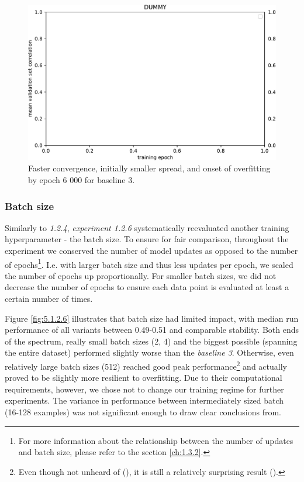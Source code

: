 \begin{figure}[H]
    \centering
    \includegraphics[width=1\textwidth]{../figures/05_dummy}
    \caption[Experiment 1.2.5]{Faster convergence, initially smaller spread, and onset of overfitting by epoch 6 000 for baseline 3.}
    \label{fig:5.1.2.5}
\end{figure}

\subsubsection{Batch size}

Similarly to \textit{1.2.4}, \textit{experiment 1.2.6} systematically reevaluated another training hyperparameter - the batch size. To ensure for fair comparison, throughout the experiment we conserved the number of model updates as opposed to the number of epochs\footnote{For more information about the relationship between the number of updates and batch size, please refer to the section \ref{ch:1.3.2}.}. I.e. with larger batch size and thus less updates per epoch, we scaled the number of epochs up proportionally. For smaller batch sizes, we did not decrease the number of epochs to ensure each data point is evaluated at least a certain number of times.

Figure \ref{fig:5.1.2.6} illustrates that batch size had limited impact, with median run performance of all variants between 0.49-0.51 and comparable stability. Both ends of the spectrum, really small batch sizes (2, 4) and the biggest possible (spanning the entire dataset) performed slightly worse than the \textit{baseline 3}. Otherwise, even relatively large batch sizes (512) reached good peak performance\footnote{Even though not unheard of (\cite{2017arXiv171100489S}), it is still a relatively surprising result (\cite{2017arXiv170508741H}).} and actually proved to be slightly more resilient to overfitting. Due to their computational requirements, however, we chose not to change our training regime for further experiments. The variance in performance between intermediately sized batch (16-128 examples) was not significant enough to draw clear conclusions from.

